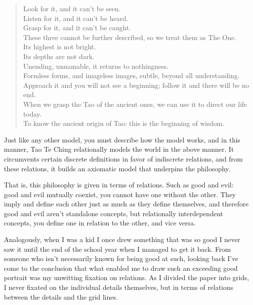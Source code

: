 \begin{verse}
Look for it, and it can't be seen.\\
Listen for it, and it can't be heard.\\
Grasp for it, and it can't be caught.\\
These three cannot be further described, so we treat them as The One.\\

Its highest is not bright.\\
Its depths are not dark.\\

Unending, unnamable, it returns to nothingness.\\
Formless forms, and imageless images, subtle, beyond all understanding.\\

Approach it and you will not see a beginning; follow it and there will be no end.\\
When we grasp the Tao of the ancient ones, we can use it to direct our life today.\\
To know the ancient origin of Tao: this is the beginning of wisdom.\\
\end{verse}

Just like any other model, you must describe how the model works, and in this manner, Tao Te Ching relationally models the world in the above manner. It circumvents certain discrete definitions in favor of indiscrete relations, and from these relations, it builds an axiomatic model that underpins the philosophy.

That is, this philosophy is given in terms of relations. Such as good and evil: good and evil mutually coexist, you cannot have one without the other. They imply and define each other just as much as they define themselves, and therefore good and evil aren’t standalone concepts, but relationally interdependent concepts, you define one in relation to the other, and vice versa. 

Analogously, when I was a kid I once drew something that was so good I never saw it until the end of the school year when I managed to get it back. From someone who isn’t necessarily known for being good at such, looking back I’ve come to the conclusion that what enabled me to draw such an exceeding good portrait was my unwitting fixation on relations. As I divided the paper into grids, I never fixated on the individual details themselves, but in terms of relations between the details and the grid lines.

